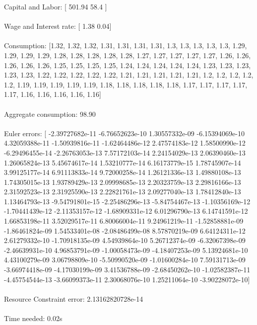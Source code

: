 \documentclass[letterpaper,12pt]{article}
\theoremstyle{definition}
\begin{document}
Capital and Labor: 		 [ 501.94   58.4 ] \\
\\
 Wage and Interest rate: 	 [ 1.38  0.04] \\
 \\
 Consumption: 			 [1.32, 1.32, 1.32, 1.31, 1.31, 1.31, 1.31, 1.3, 1.3, 1.3, 1.3, 1.3, 1.29, 1.29, 1.29, 1.29, 1.28, 1.28, 1.28, 1.28, 1.28, 1.27, 1.27, 1.27, 1.27, 1.27, 1.26, 1.26, 1.26, 1.26, 1.26, 1.25, 1.25, 1.25, 1.25, 1.24, 1.24, 1.24, 1.24, 1.24, 1.23, 1.23, 1.23, 1.23, 1.23, 1.22, 1.22, 1.22, 1.22, 1.22, 1.21, 1.21, 1.21, 1.21, 1.21, 1.2, 1.2, 1.2, 1.2, 1.2, 1.19, 1.19, 1.19, 1.19, 1.19, 1.18, 1.18, 1.18, 1.18, 1.18, 1.17, 1.17, 1.17, 1.17, 1.17, 1.16, 1.16, 1.16, 1.16, 1.16]\\
 \\
 Aggregate consumption: 98.90\\
 \\
Euler errors:  [ -2.39727682e-11  -6.76652623e-10   1.30557332e-09  -6.15394069e-10
   4.32059388e-11  -1.50939816e-11  -1.62464486e-12   2.47574183e-12
   1.58500990e-12  -6.29496455e-14  -2.26763053e-13   7.57172103e-14
   2.24154029e-13   2.06390460e-13   1.26065824e-13   5.45674617e-14
   1.53210777e-14   6.16173779e-15   1.78745907e-14   3.99125177e-14
   6.91113833e-14   9.72000258e-14   1.26121336e-13   1.49880108e-13
   1.74305015e-13   1.93789429e-13   2.09998685e-13   2.20323759e-13
   2.29816166e-13   2.31592523e-13   2.31925590e-13   2.22821761e-13
   2.09277040e-13   1.78412840e-13   1.13464793e-13  -9.54791801e-15
  -2.25486296e-13  -5.84754467e-13  -1.10356169e-12  -1.70441439e-12
  -2.11353157e-12  -1.68909331e-12   6.01296790e-13   6.14741591e-12
   1.66853198e-11   3.52029517e-11   6.80066004e-11   9.24961219e-11
  -1.52858881e-09  -1.86461824e-09   1.54533401e-08  -2.08486499e-08
   8.57870219e-09   6.64124311e-12   2.61279332e-10  -1.70918135e-09
   4.54939864e-10   5.26712374e-09  -6.32067398e-09  -2.46639931e-10
   4.96853791e-09  -1.00058473e-09  -4.18407253e-09   5.13924681e-10
   4.43100279e-09   3.06798809e-10  -5.50990520e-09  -1.01600284e-10
   7.59131713e-09  -3.66974418e-09  -4.17030199e-09   3.41536788e-09
  -2.68450262e-10  -1.02582387e-11  -4.45754544e-13  -3.66099373e-11
   2.30068076e-10   1.25211064e-10  -3.90228072e-10]\\
   \\
Resource Constraint error:  2.13162820728e-14\\
\\
Time needed: 0.02s\\
\end{document}
